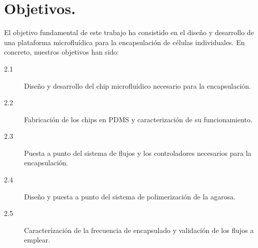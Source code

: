 \section{Objetivos.}\label{sec:2_objetivos}


El objetivo fundamental de este trabajo ha consistido en el diseño y desarrollo de una plataforma microfluídica para la encapsulación de células individuales. En concreto, nuestros objetivos han sido:
\vspace{-2mm}
\begin{description}
\item[2.1] Diseño y desarrollo del chip microfluídico necesario para la encapsulación.
\vspace{-2mm}
\item[2.2] Fabricación de los chips en PDMS y caracterización de su funcionamiento.
\vspace{-2mm}
\item[2.3] Puesta a punto del sistema de flujos y los controladores necesarios para la encapsulación.
\vspace{-2mm}
\item[2.4] Diseño y puesta a punto del sistema de polimerización de la agarosa.
\vspace{-2mm}
\item[2.5] Caracterización de la frecuencia de encapsulado y validación de los flujos a emplear.
\end{description}